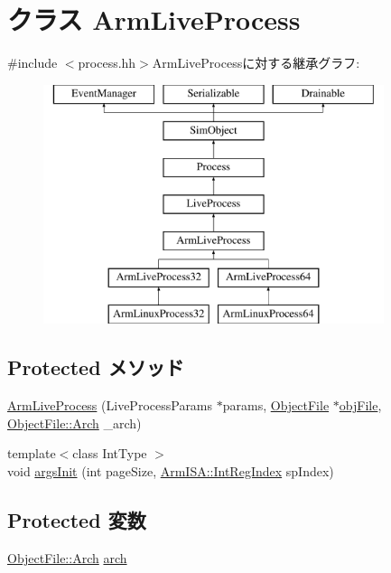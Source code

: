 \hypertarget{classArmLiveProcess}{
\section{クラス ArmLiveProcess}
\label{classArmLiveProcess}
}


{\ttfamily \#include $<$process.hh$>$}ArmLiveProcessに対する継承グラフ:\begin{figure}[H]
\begin{center}
\leavevmode
\includegraphics[height=7cm]{classArmLiveProcess}
\end{center}
\end{figure}
\subsection*{Protected メソッド}
\begin{DoxyCompactItemize}
\item 
\hyperlink{classArmLiveProcess_a905a4ab86fb0bcc4d972b63b79939dad}{ArmLiveProcess} (LiveProcessParams $\ast$params, \hyperlink{classObjectFile}{ObjectFile} $\ast$\hyperlink{classLiveProcess_ab6cfcfa7903c66267b3e0351c3caa809}{objFile}, \hyperlink{classObjectFile_a0ac03ab06a859320a9072002bdf3aa0f}{ObjectFile::Arch} \_\-arch)
\item 
{\footnotesize template$<$class IntType $>$ }\\void \hyperlink{classArmLiveProcess_a5dfec1d2426044bb04b75e1d2ba37b71}{argsInit} (int pageSize, \hyperlink{namespaceArmISA_ae64680ba9fb526106829d6bf92fc791b}{ArmISA::IntRegIndex} spIndex)
\end{DoxyCompactItemize}
\subsection*{Protected 変数}
\begin{DoxyCompactItemize}
\item 
\hyperlink{classObjectFile_a0ac03ab06a859320a9072002bdf3aa0f}{ObjectFile::Arch} \hyperlink{classArmLiveProcess_abf93aa1dd69df35e2a50f63d5a5d4c40}{arch}
\end{DoxyCompactItemize}


